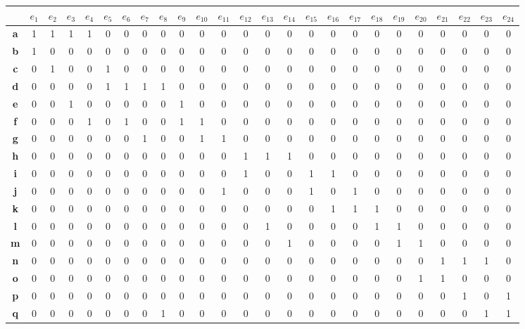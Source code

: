 \documentclass[a4paper,12pt]{article}
\begin{document}
\begin{center}
\tiny
\begin{tabular*}{\textwidth}{c|@{\extracolsep{\fill}}cccccccccccccccccccccccc}
\rowcolor[gray]{0.9}
 & \textbf{$e_1$} & \textbf{$e_2$} & \textbf{$e_3$} & \textbf{$e_4$} & \textbf{$e_5$} & \textbf{$e_6$} & \textbf{$e_7$} & \textbf{$e_8$} & \textbf{$e_9$} & \textbf{$e_{10}$} & \textbf{$e_{11}$} & \textbf{$e_{12}$} & \textbf{$e_{13}$} & \textbf{$e_{14}$} & \textbf{$e_{15}$} & \textbf{$e_{16}$} & \textbf{$e_{17}$} & \textbf{$e_{18}$} & \textbf{$e_{19}$} & \textbf{$e_{20}$} & \textbf{$e_{21}$} & \textbf{$e_{22}$} & \textbf{$e_{23}$} & \textbf{$e_{24}$} \\
\hline
\textbf{a} & 1&1&1&1&0&0&0&0&0&0&0&0&0&0&0&0&0&0&0&0&0&0&0&0 \\
\textbf{b} & 1&0&0&0&0&0&0&0&0&0&0&0&0&0&0&0&0&0&0&0&0&0&0&0 \\
\textbf{c} & 0&1&0&0&1&0&0&0&0&0&0&0&0&0&0&0&0&0&0&0&0&0&0&0 \\
\textbf{d} & 0&0&0&0&1&1&1&1&0&0&0&0&0&0&0&0&0&0&0&0&0&0&0&0 \\
\textbf{e} & 0&0&1&0&0&0&0&0&1&0&0&0&0&0&0&0&0&0&0&0&0&0&0&0 \\
\textbf{f} & 0&0&0&1&0&1&0&0&1&1&0&0&0&0&0&0&0&0&0&0&0&0&0&0 \\
\textbf{g} & 0&0&0&0&0&0&1&0&0&1&1&0&0&0&0&0&0&0&0&0&0&0&0&0 \\
\textbf{h} & 0&0&0&0&0&0&0&0&0&0&0&1&1&1&0&0&0&0&0&0&0&0&0&0 \\
\textbf{i} & 0&0&0&0&0&0&0&0&0&0&0&1&0&0&1&1&0&0&0&0&0&0&0&0 \\
\textbf{j} & 0&0&0&0&0&0&0&0&0&0&1&0&0&0&1&0&1&0&0&0&0&0&0&0 \\
\textbf{k} & 0&0&0&0&0&0&0&0&0&0&0&0&0&0&0&1&1&1&0&0&0&0&0&0 \\
\textbf{l} & 0&0&0&0&0&0&0&0&0&0&0&0&1&0&0&0&0&1&1&0&0&0&0&0 \\
\textbf{m} & 0&0&0&0&0&0&0&0&0&0&0&0&0&1&0&0&0&0&1&1&0&0&0&0 \\
\textbf{n} & 0&0&0&0&0&0&0&0&0&0&0&0&0&0&0&0&0&0&0&0&1&1&1&0 \\
\textbf{o} & 0&0&0&0&0&0&0&0&0&0&0&0&0&0&0&0&0&0&0&1&1&0&0&0 \\
\textbf{p} & 0&0&0&0&0&0&0&0&0&0&0&0&0&0&0&0&0&0&0&0&0&1&0&1 \\
\textbf{q} & 0&0&0&0&0&0&0&1&0&0&0&0&0&0&0&0&0&0&0&0&0&0&1&1 \\
\end{tabular*}
\end{center}
\end{document}
